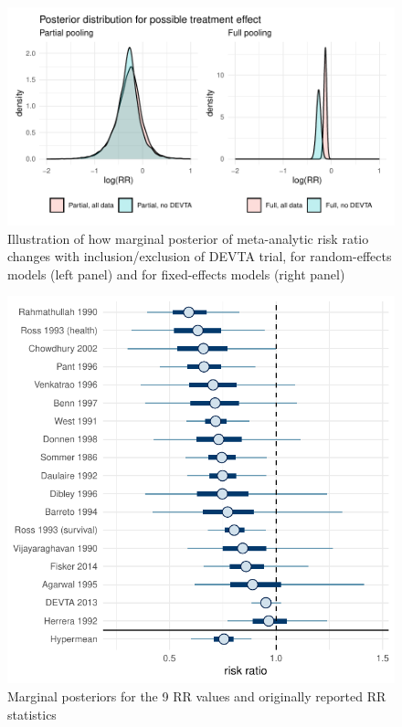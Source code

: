 \documentclass[12pt]{article}
\begin{document}
\begin{figure}[h!]
\includegraphics{baggr-density.pdf}
\caption{Illustration of how marginal posterior of meta-analytic risk ratio changes with inclusion/exclusion of DEVTA trial, for random-effects models (left panel) and for fixed-effects models (right panel)}
\label{baggr-density}
\end{figure}

\begin{figure}[h!]
\centering
\includegraphics{baggr-re.pdf}
\caption{Marginal posteriors for the 9 RR values and originally reported RR statistics} 
\label{baggr-re}
\end{figure}
\end{document}
